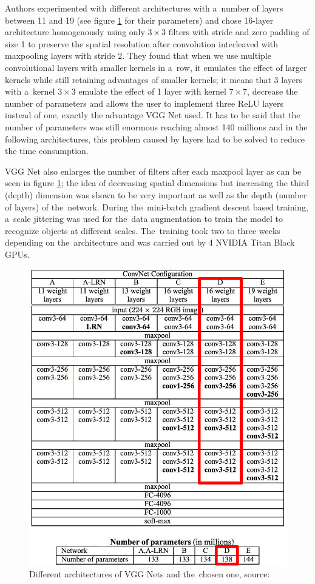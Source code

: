 Authors experimented with different architectures with a~number of layers
between 11 and 19 (see figure \ref{fig:vgg} for their parameters) and chose
16-layer architecture homogenously using only $3 \times 3$ filters with stride
and zero padding of size 1 to preserve the spatial resolution after convolution
interleaved with maxpooling layers with stride 2. They found that when we use 
multiple convolutional layers with smaller kernels in a~row, it emulates the 
effect of larger kernels while still retaining advantages of smaller kernels;
it means that 3 layers with a~kernel $3 \times 3$ emulate the effect of 1 layer
with kernel $7 \times 7$, decrease the number of parameters and allows the user
to implement three ReLU layers instead of one, exactly the advantage VGG Net
used. It has to be said that the number of parameters was still enormous
reaching almost 140 millions and in the following architectures, this problem
caused by  layers had to be solved to reduce the time consumption.

VGG Net also enlarges the number of filters after each maxpool layer as can be 
seen in figure \ref{fig:vgg}; the idea of decreasing spatial dimensions but 
increasing the third (depth) dimension was shown to be very important as well
as the depth (number of layers) of the~network. During the~mini-batch gradient 
descent based training, a~scale jittering was used for the~data augmentation to
train the model to recognize objects at different scales. The~training took two
to three weeks depending on the~architecture and was carried out by 4 NVIDIA 
Titan Black GPUs.

\begin{figure}[H]
   \centering
	\includegraphics[width=0.8\linewidth]{./pictures/vgg-net.png}
	\caption[VGG Net networks]{Different architectures of VGG Nets and the~chosen
	one, source: \cite{vgg}}
      \label{fig:vgg}
\end{figure}

